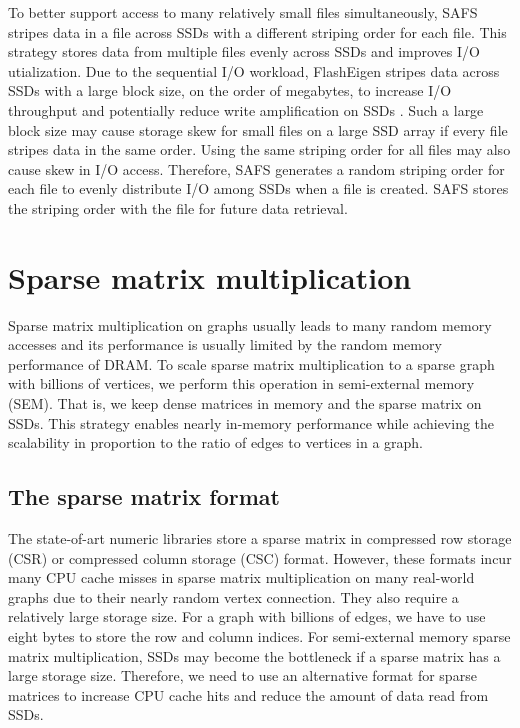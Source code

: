 To better support access to many relatively small files simultaneously, SAFS
stripes data in a file across SSDs with a different striping order for each file.
This strategy stores data from multiple files evenly across SSDs and improves
I/O utialization. Due to the sequential I/O workload, FlashEigen stripes data
across SSDs with a large block size, on the order of megabytes, to increase I/O
throughput and potentially reduce write amplification on SSDs \cite{Tang15}.
Such a large block size may cause storage skew for small files
on a large SSD array if every file stripes data in the same order. Using
the same striping order for all files may also cause skew in I/O access.
Therefore, SAFS generates a random striping order for each file to evenly
distribute I/O among SSDs when a file is created. SAFS stores the striping
order with the file for future data retrieval.

\section{Sparse matrix multiplication}
Sparse matrix multiplication on graphs usually leads to many random memory
accesses and its performance is usually limited by the random memory performance
of DRAM. To scale sparse matrix multiplication to a sparse graph with billions
of vertices, we perform this operation in semi-external memory (SEM). That is,
we keep dense matrices in memory and the sparse
matrix on SSDs. This strategy enables nearly in-memory performance while achieving
the scalability in proportion to the ratio of edges to vertices in a graph.

\subsection{The sparse matrix format}
The state-of-art numeric libraries store a sparse matrix in compressed row storage
(CSR) or compressed column storage (CSC) format. However, these formats incur
many CPU cache misses in sparse matrix multiplication on many real-world graphs
due to their nearly random vertex connection. They also require a relatively
large storage size. For a graph with billions of edges, we have to use eight
bytes to store the row and column indices. For semi-external memory sparse
matrix multiplication, SSDs may become the bottleneck if a sparse matrix has
a large storage size.
Therefore, we need to use an alternative format for sparse matrices to increase
CPU cache hits and reduce the amount of data read from SSDs.

